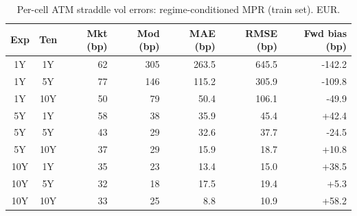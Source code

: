 \begin{table}[H]
\centering
\caption{Per-cell ATM straddle vol errors: regime-conditioned MPR (train set). EUR.}
\label{tab:regime_mpr_per_cell_train}
\small
\begin{tabular}{@{}ccrrrrr@{}}
\toprule
\textbf{Exp} & \textbf{Ten} & \textbf{Mkt (bp)} & \textbf{Mod (bp)} & \textbf{MAE (bp)} & \textbf{RMSE (bp)} & \textbf{Fwd bias (bp)} \\
\midrule
  1Y & 1Y & 62 & 305 & 263.5 & 645.5 & -142.2 \\
  1Y & 5Y & 77 & 146 & 115.2 & 305.9 & -109.8 \\
  1Y & 10Y & 50 & 79 & 50.4 & 106.1 & -49.9 \\
  \midrule
  5Y & 1Y & 58 & 38 & 35.9 & 45.4 & +42.4 \\
  5Y & 5Y & 43 & 29 & 32.6 & 37.7 & -24.5 \\
  5Y & 10Y & 37 & 29 & 15.9 & 18.7 & +10.8 \\
  \midrule
  10Y & 1Y & 35 & 23 & 13.4 & 15.0 & +38.5 \\
  10Y & 5Y & 32 & 18 & 17.5 & 19.4 & +5.3 \\
  10Y & 10Y & 33 & 25 & 8.8 & 10.9 & +58.2 \\
\bottomrule
\end{tabular}
\end{table}